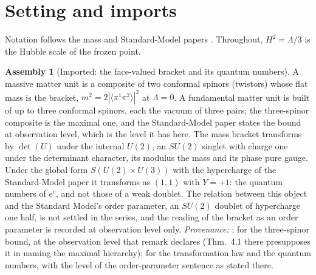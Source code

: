 \documentclass[11pt]{article}
\theoremstyle{definition}
\newtheorem{assembled}[theorem]{Assembly}
\theoremstyle{plain}
\newcommand{\changedmark}[2]{\marginpar{\raggedright\scriptsize\color{#1}#2}}
\providecommand{\br}{}\renewcommand{\br}[1]{\langle #1\rangle}
\begin{document}
\section{Setting and imports}

\label{c:note.families.setting-setting-imports}
Notation follows the mass and Standard-Model papers \cite{ButlerT11, ButlerT12}. Throughout, $H^{2} = \Lambda/3$ is the Hubble scale of the frozen point.

\begin{assembled}[Imported: the face-valued bracket and its quantum numbers]\label{c:families.imported-face-valued-bracket-quantum-numbers}
\changedmark{gray}{reworded}
A massive matter unit is a composite of two conformal spinors (twistors) whose flat mass is the bracket, $m^{2} = 2|\br{\pi^{1}\pi^{2}}|^{2}$ at $\Lambda = 0$. A fundamental matter unit is built of up to three conformal spinors, each the vacuum of three pairs; the three-spinor composite is the maximal one, and the Standard-Model paper states the bound at observation level, which is the level it has here. The mass bracket transforms by $\det(U)$ under the internal $U(2)$, an $SU(2)$ singlet with charge one under the determinant character, its modulus the mass and its phase pure gauge. Under the global form $S(U(2) \times U(3))$ with the hypercharge of the Standard-Model paper it transforms as $(1,1)$ with $Y = +1$: the quantum numbers of $e^{c}$, and not those of a weak doublet. The relation between this object and the Standard Model's order parameter, an $SU(2)$ doublet of hypercharge one half, is not settled in the series, and the reading of the bracket as an order parameter is recorded at observation level only. \emph{Provenance:} \cite[Prop.~4.1]{ButlerT11}; \cite[Rem.~3.3]{ButlerT12} for the three-spinor bound, at the observation level that remark declares (Thm.~4.1 there presupposes it in naming the maximal hierarchy); \cite[Props.~3.1-3.2]{ButlerT12} for the transformation law and the quantum numbers, with the level of the order-parameter sentence as stated there.
\end{assembled}
\end{document}
